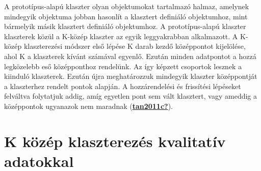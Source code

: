 \documentclass[
]{book}
\begin{document}
A prototípus-alapú klaszter olyan objektumokat tartalmazó halmaz,
amelynek mindegyik objektuma jobban hasonlít a klasztert definiáló
objektumhoz, mint bármelyik másik klasztert definiáló objektumhoz. A
prototípus-alapú klaszter klaszterek közül a K-közép klaszter az egyik
leggyakrabban alkalmazott. A K-közép klaszterezési módszer első lépése K
darab kezdő középpontot kijelölése, ahol K a klaszterek kívánt számával
egyenlő. Ezután minden adatpontot a hozzá legközelebb eső középponthoz
rendelünk. Az így képzett csoportok lesznek a kiinduló klaszterek.
Ezután újra meghatározzuk mindegyik klaszter középpontját a klaszterhez
rendelt pontok alapján. A hozzárendelési és frissítési lépéseket
felváltva folytatjuk addig, amíg egyetlen pont sem vált klasztert, vagy
ameddig a középpontok ugyanazok nem maradnak
(\protect\hyperlink{ref-tan2011c}{\textbf{tan2011c?}}).

\hypertarget{k-kuxf6zuxe9p-klaszterezuxe9s-kvalitatuxedv-adatokkal}{%
\section{K közép klaszterezés kvalitatív
adatokkal}\label{k-kuxf6zuxe9p-klaszterezuxe9s-kvalitatuxedv-adatokkal}}
\end{document}
